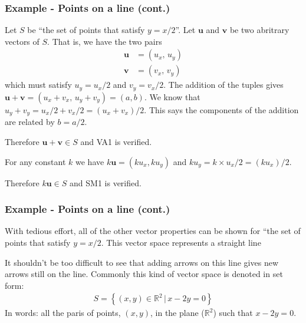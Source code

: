 \documentclass[usenames,dvipsnames,aspectratio=169,10pt]{beamer}
\numberwithin{equation}{section}
\begin{document}
\begin{frame}
\frametitle{Example - Points on a line (cont.)}
Let $S$ be ``the set of points that satisfy $y=x/2$''. Let $\textbf{u}$ and $\textbf{v}$ be two abritrary vectors of $S$. That is, we have the two pairs
\begin{align*}
\textbf{u} &= (u_x, \, u_y) \\
\textbf{v} &= (v_x, \, v_y)
\end{align*}
which must satisfy $u_y = u_x/2$ and $v_y =  v_x/2$. The addition of the tuples gives $\textbf{u}+\textbf{v} = (u_x + v_x, \, u_y +  v_y) = (a,b)$. We know that $u_y +  v_y = u_x/2 +  v_x/2 = (u_x +  v_x)/2$. This says the components of the addition are related by $b=a/2$. 

Therefore $\textbf{u}+\textbf{v}\in S$ and VA1 is verified.
 
For any constant $k$ we have $k\textbf{u}=(ku_x,ku_y)$ and $ku_y = k\times u_x/2 = (ku_x)/2$. 

Therefore $k\textbf{u}\in S$ and SM1 is verified.
\end{frame}




\begin{frame}
\frametitle{Example - Points on a line (cont.)}
With tedious effort, all of the other vector properties can be shown for ``the set of points that satisfy $y=x/2$. This vector space represents a straight line

\begin{figure}[H]
\centering
{}
\end{figure}
It shouldn't be too difficult to see that adding arrows on this line gives new arrows still on the line. Commonly this kind of vector space is denoted in set form:
\begin{align*}
S = \left\{ (x,y)\in \mathbb{R}^2 \, | \, x-2y = 0\right\}
\end{align*}
In words: all the paris of points, $(x,y)$, in the plane ($\mathbb{R}^2$) such that $x-2y=0$.
\end{frame}
\fi
\end{document}
